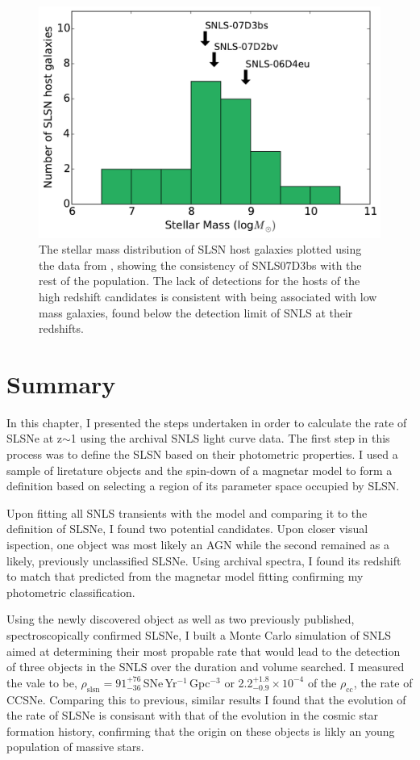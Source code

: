 \begin{figure}
\includegraphics[width=\textwidth]{Figures/Chapter4/Galaxy}
\caption{The stellar mass distribution of SLSN host galaxies plotted using the data from \citet{Lunnan2014}, showing the consistency of SNLS07D3bs with the rest of the population. The lack of detections for the hosts of the high redshift candidates is consistent with being associated with low mass galaxies, found below the detection limit of SNLS at their redshifts.}
\label{fig:hosts}
\end{figure}

\section{Summary}
In this chapter, I presented the steps undertaken in order to calculate the rate of SLSNe at z$\sim$1 using the archival SNLS light curve data. The first step in this process was to define the SLSN based on their photometric properties. I used a sample of liretature objects and the spin-down of a magnetar model to form a definition based on selecting a region of its parameter space occupied by SLSN.

Upon fitting all SNLS transients with the model and comparing it to the definition of SLSNe, I found two potential candidates. Upon closer visual ispection, one object was most likely an AGN while the second remained as a likely, previously unclassified SLSNe. Using archival spectra, I found its redshift to match that predicted from the magnetar model fitting confirming my photometric classification.

Using the newly discovered object as well as two previously published, spectroscopically confirmed SLSNe, I built a Monte Carlo simulation of SNLS aimed at determining their most propable rate that would lead to the detection of three objects in the SNLS over the duration and volume searched. I measured the vale to be, $\rho_{\mathrm{slsn}} = 91^{+76}_{-36}$\,SNe\,Yr$^{-1}$\,Gpc$^{-3}$ or 2.2$^{+1.8}_{-0.9}\times10^{-4}$ of the $\rho_{\mathrm{cc}}$, the rate of CCSNe. Comparing this to previous, similar results I found that the evolution of the rate of SLSNe is consisant with that of the evolution in the cosmic star formation history, confirming that the origin on these objects is likly an young population of massive stars.
